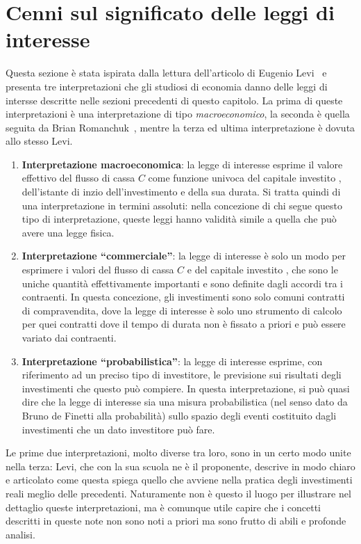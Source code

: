 \section{Cenni sul significato delle leggi di interesse}
\label{sec:significato}

Questa sezione è stata ispirata dalla lettura dell'articolo di Eugenio Levi~\cite{Levi1957} e presenta tre interpretazioni che gli studiosi di economia
danno delle leggi di intersse descritte nelle sezioni precedenti di questo capitolo. La prima di queste interpretazioni è una interpretazione di tipo
\emph{macroeconomico}, la seconda è quella seguita da Brian Romanchuk~\cite{Romanchuk2021}, mentre la terza ed ultima interpretazione è dovuta allo
stesso Levi.
\begin{enumerate}
\item \textbf{Interpretazione macroeconomica}: la legge di interesse esprime il valore effettivo del flusso di cassa $C$ come funzione univoca del capitale investito
  \VA, dell’istante di inzio dell’investimento e della sua durata. Si tratta quindi di una interpretazione in termini assoluti: nella concezione di chi segue questo
  tipo di interpretazione, queste leggi hanno validità simile a quella che può avere una legge fisica.
\item \textbf{Interpretazione ``commerciale''}\footnotemark{}: la legge di interesse è solo un modo per esprimere i valori del flusso di cassa $C$ e  del capitale
  investito \VA,  che sono le uniche quantità effettivamente importanti e sono definite dagli accordi tra i contraenti. In questa concezione, gli investimenti sono
  solo comuni contratti di compravendita,  dove la legge di interesse è solo uno strumento di calcolo per quei contratti dove il tempo di durata non è fissato a
  priori e può essere variato dai contraenti.
\item \textbf{Interpretazione ``probabilistica''}\footnotemark[\value{footnote}]: la legge di interesse esprime, con riferimento ad un preciso tipo di investitore,
  le previsione sui risultati degli investimenti che questo può compiere. In questa interpretazione, si può quasi dire che la legge di interesse sia una misura
  probabilistica (nel senso dato da Bruno de Finetti alla probabilità) sullo spazio degli eventi costituito dagli investimenti che un dato investitore può fare.
\end{enumerate}

Le prime due interpretazioni, molto diverse tra loro, sono in un certo modo unite nella terza: Levi, che con la sua scuola ne è il proponente, descrive in modo
chiaro e articolato come questa spiega quello che avviene nella pratica degli investimenti reali meglio delle precedenti. Naturamente non è questo il luogo per
illustrare nel dettaglio queste interpretazioni, ma è comunque utile capire che i concetti descritti in queste note non sono noti a priori ma sono frutto di abili
e profonde analisi.

